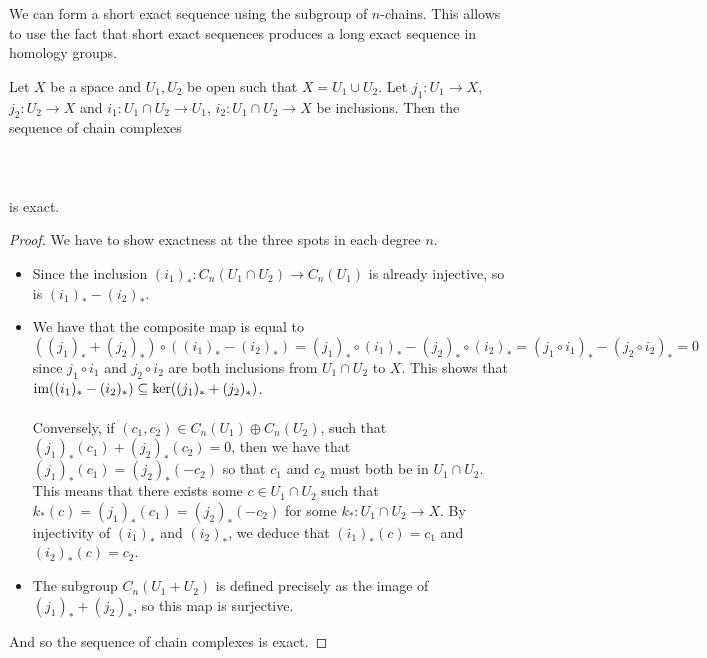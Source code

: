 \documentclass[a4paper]{article}
\begin{document}
We can form a short exact sequence using the subgroup of $n$-chains. This allows to use the fact that short exact sequences produces a long exact sequence in homology groups. 

\begin{prp}{}{} Let $X$ be a space and $U_1,U_2$ be open such that $X=U_1\cup U_2$. Let $j_1:U_1\to X$, $j_2:U_2\to X$ and $i_1:U_1\cap U_2\to U_1$, $i_2:U_1\cap U_2\to X$ be inclusions. Then the sequence of chain complexes \\~\\
\\~\\
is exact. \tcbline
\begin{proof}
We have to show exactness at the three spots in each degree $n$. 
\begin{itemize}
\item Since the inclusion $(i_1)_\ast:C_n(U_1\cap U_2)\to C_n(U_1)$ is already injective, so is $(i_1)_\ast-(i_2)_\ast$. 
\item We have that the composite map is equal to $$((j_1)_\ast+(j_2)_\ast)\circ((i_1)_\ast-(i_2)_\ast)=(j_1)_\ast\circ(i_1)_\ast-(j_2)_\ast\circ(i_2)_\ast=(j_1\circ i_1)_\ast-(j_2\circ i_2)_\ast=0$$ since $j_1\circ i_1$ and $j_2\circ i_2$ are both inclusions from $U_1\cap U_2$ to $X$. This shows that $\operatorname{im}((i_1)_\ast-(i_2)_\ast)\subseteq\ker((j_1)_\ast+(j_2)_\ast)$. \\~\\

Conversely, if $(c_1,c_2)\in C_n(U_1)\oplus C_n(U_2)$, such that $(j_1)_\ast(c_1)+(j_2)_\ast(c_2)=0$, then we have that $(j_1)_\ast(c_1)=(j_2)_\ast(-c_2)$ so that $c_1$ and $c_2$ must both be in $U_1\cap U_2$. This means that there exists some $c\in U_1\cap U_2$ such that $k_\ast(c)=(j_1)_\ast(c_1)=(j_2)_\ast(-c_2)$ for some $k_\ast:U_1\cap U_2\to X$. By injectivity of $(i_1)_\ast$ and $(i_2)_\ast$, we deduce that $(i_1)_\ast(c)=c_1$ and $(i_2)_\ast(c)=c_2$. 
\item The subgroup $C_n(U_1+U_2)$ is defined precisely as the image of $(j_1)_\ast+(j_2)_\ast$, so this map is surjective. 
\end{itemize}
And so the sequence of chain complexes is exact. 
\end{proof}
\end{prp}
\end{document}
